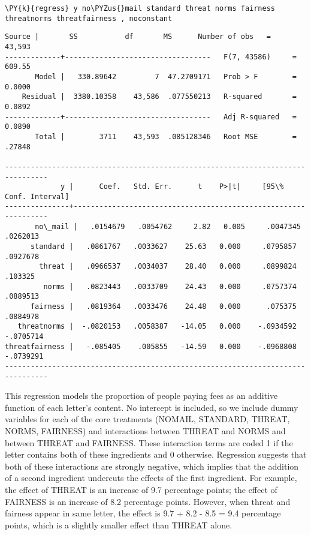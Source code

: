 \documentclass[11pt,notitlepage]{article}\usepackage[]{graphicx}\usepackage[]{color}
\makeatletter
\newenvironment{kframe}{%
 \def\at@end@of@kframe{}%
 \ifinner\ifhmode%
  \def\at@end@of@kframe{\end{minipage}}%
  \begin{minipage}{\columnwidth}%
 \fi\fi%
 \def\FrameCommand##1{\hskip\@totalleftmargin \hskip-\fboxsep
 \colorbox{shadecolor}{##1}\hskip-\fboxsep
     \hskip-\linewidth \hskip-\@totalleftmargin \hskip\columnwidth}%
 \MakeFramed {\advance\hsize-\width
   \@totalleftmargin\z@ \linewidth\hsize
   \@setminipage}}%
 {\par\unskip\endMakeFramed%
 \at@end@of@kframe}
\newenvironment{knitrout}{}{} %
\makeatother
\begin{document}
\begin{enumerate}[a)]
\begin{knitrout}
\begin{kframe}
\begin{Verbatim}[commandchars=\\\{\}]
        \PY{k}{regress} y no\PYZus{}mail standard threat norms fairness threatnorms threatfairness , noconstant
\end{Verbatim}

    \begin{Verbatim}[commandchars=\\\{\}]
      Source |       SS           df       MS      Number of obs   =    43,593
-------------+----------------------------------   F(7, 43586)     =    609.55
       Model |   330.89642         7  47.2709171   Prob > F        =    0.0000
    Residual |  3380.10358    43,586  .077550213   R-squared       =    0.0892
-------------+----------------------------------   Adj R-squared   =    0.0890
       Total |        3711    43,593  .085128346   Root MSE        =    .27848

--------------------------------------------------------------------------------
             y |      Coef.   Std. Err.      t    P>|t|     [95\% Conf. Interval]
---------------+----------------------------------------------------------------
       no\_mail |   .0154679   .0054762     2.82   0.005     .0047345    .0262013
      standard |   .0861767   .0033627    25.63   0.000     .0795857    .0927678
        threat |   .0966537   .0034037    28.40   0.000     .0899824     .103325
         norms |   .0823443   .0033709    24.43   0.000     .0757374    .0889513
      fairness |   .0819364   .0033476    24.48   0.000      .075375    .0884978
   threatnorms |  -.0820153   .0058387   -14.05   0.000    -.0934592   -.0705714
threatfairness |   -.085405    .005855   -14.59   0.000    -.0968808   -.0739291
--------------------------------------------------------------------------------

    \end{Verbatim}
\end{kframe}
\end{knitrout}

This regression models the proportion of people paying fees as an additive function of each letter's content. No intercept is included, so we include dummy variables for each of the core treatments (NOMAIL, STANDARD, THREAT, NORMS, FAIRNESS) and interactions between THREAT and NORMS and between THREAT and FAIRNESS.  These interaction terms are coded 1 if the letter contains both of these ingredients and 0 otherwise.  Regression suggests that both of these interactions are strongly negative, which implies that the addition of a second ingredient undercuts the effects of the first ingredient.  For example, the effect of THREAT is an increase of 9.7 percentage points; the effect of FAIRNESS is an increase of 8.2 percentage points.  However, when threat and fairness appear in same letter, the effect is 9.7 + 8.2 - 8.5 = 9.4 percentage points, which is a slightly smaller effect than THREAT alone. 


\end{enumerate}
\end{document}
